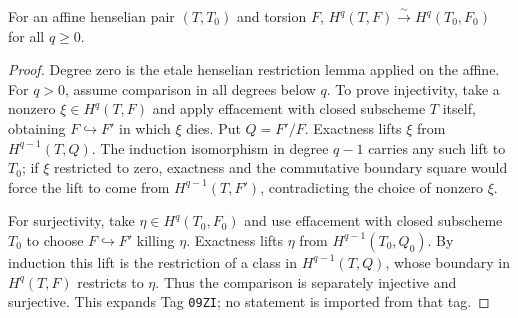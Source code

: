 \begin{proposition}
\label{prop:weil-pbc-gabber-affine-comparison}
\uses{}
For an affine henselian pair $(T,T_0)$ and torsion $F$,
$H^q(T,F)\xrightarrow{\sim}H^q(T_0,F_0)$ for all $q\geq0$.
\end{proposition}
\begin{proof}
Degree zero is the etale henselian restriction lemma applied on the affine.
For $q>0$, assume comparison in all degrees below $q$.  To prove injectivity,
take a nonzero $\xi\in H^q(T,F)$ and apply effacement with closed subscheme
$T$ itself, obtaining $F\hookrightarrow F'$ in which $\xi$ dies.  Put
$Q=F'/F$.  Exactness lifts $\xi$ from $H^{q-1}(T,Q)$.  The induction
isomorphism in degree $q-1$ carries any such lift to $T_0$; if $\xi$ restricted
to zero, exactness and the commutative boundary square would force the lift
to come from $H^{q-1}(T,F')$, contradicting the choice of nonzero $\xi$.

For surjectivity, take $\eta\in H^q(T_0,F_0)$ and use effacement with closed
subscheme $T_0$ to choose $F\hookrightarrow F'$ killing $\eta$.  Exactness
lifts $\eta$ from $H^{q-1}(T_0,Q_0)$.  By induction this lift is the
restriction of a class in $H^{q-1}(T,Q)$, whose boundary in $H^q(T,F)$
restricts to $\eta$.  Thus the comparison is separately injective and
surjective.  This expands Tag \texttt{09ZI}; no statement is imported from
that tag.
\end{proof}

